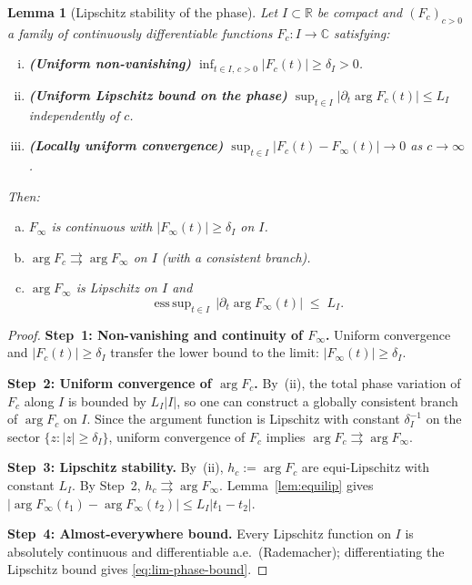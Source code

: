 \documentclass[12pt,a4paper]{amsart}
\newtheorem{lemma}[theorem]{Lemma}
\theoremstyle{definition}
\begin{document}
\begin{lemma}[Lipschitz stability of the phase]
\label{lem:phase-stability}
Let $I \subset \mathbb{R}$ be compact and
$(F_c)_{c>0}$ a family of continuously differentiable
functions $F_c : I \to \mathbb{C}$ satisfying:
\begin{enumerate}[(i)]
\item \textbf{(Uniform non-vanishing)}
$\inf_{t \in I,\, c>0} |F_c(t)|
\ge \delta_I > 0$.
\item \textbf{(Uniform Lipschitz bound on the phase)}
$\sup_{t \in I}|\partial_t \arg F_c(t)| \le L_I$
independently of $c$.
\item \textbf{(Locally uniform convergence)}
$\sup_{t \in I}|F_c(t) - F_\infty(t)| \to 0$
as $c \to \infty$.
\end{enumerate}
Then:
\begin{enumerate}[(a)]
\item $F_\infty$ is continuous with
$|F_\infty(t)| \ge \delta_I$ on $I$.
\item $\arg F_c \rightrightarrows \arg F_\infty$
on $I$ (with a consistent branch).
\item $\arg F_\infty$ is Lipschitz on $I$ and
\begin{equation}
\operatorname{ess\,sup}_{t \in I}\,
|\partial_t \arg F_\infty(t)|
\;\le\; L_I.
\label{eq:lim-phase-bound}
\end{equation}
\end{enumerate}
\end{lemma}

\begin{proof}
\textbf{Step~1: Non-vanishing and continuity of
$F_\infty$.}
Uniform convergence and $|F_c(t)| \ge \delta_I$
transfer the lower bound to the limit:
$|F_\infty(t)| \ge \delta_I$.

\textbf{Step~2: Uniform convergence of $\arg F_c$.}
By~(ii), the total phase variation of $F_c$ along $I$
is bounded by $L_I|I|$, so one can construct a
globally consistent branch of $\arg F_c$ on $I$.
Since the argument function is Lipschitz with
constant $\delta_I^{-1}$ on the sector
$\{z : |z| \ge \delta_I\}$, uniform convergence of
$F_c$ implies
$\arg F_c \rightrightarrows \arg F_\infty$.

\textbf{Step~3: Lipschitz stability.}
By~(ii), $h_c := \arg F_c$ are equi-Lipschitz with
constant $L_I$. By Step~2,
$h_c \rightrightarrows \arg F_\infty$.
Lemma~\ref{lem:equilip} gives
$|\arg F_\infty(t_1) - \arg F_\infty(t_2)|
\le L_I|t_1-t_2|$.

\textbf{Step~4: Almost-everywhere bound.}
Every Lipschitz function on $I$ is absolutely
continuous and differentiable a.e.\ (Rademacher);
differentiating the Lipschitz bound gives
\eqref{eq:lim-phase-bound}.
\end{proof}
\end{document}
